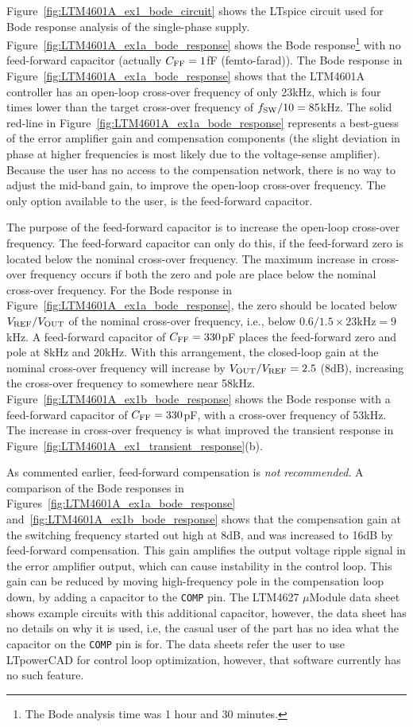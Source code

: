 Figure~\ref{fig:LTM4601A_ex1_bode_circuit} shows the LTspice
circuit used for Bode response analysis of the single-phase 
supply.
Figure~\ref{fig:LTM4601A_ex1a_bode_response} shows the
Bode response\footnote{The Bode analysis time
was 1 hour and 30 minutes.} with no feed-forward capacitor
(actually $C_{\rm FF} = 1$fF (femto-farad)).
The Bode response in Figure~\ref{fig:LTM4601A_ex1a_bode_response}
shows that the LTM4601A controller has an open-loop cross-over
frequency of only 23kHz, which is four times lower than the
target cross-over frequency of $f_{\rm SW}/10 = 85$kHz. 
The solid red-line in Figure~\ref{fig:LTM4601A_ex1a_bode_response}
represents a best-guess of the error amplifier gain and
compensation components (the slight deviation in phase at
higher frequencies is most likely due to the voltage-sense
amplifier). Because the user has no access to the compensation
network, there is no way to adjust the mid-band gain, to improve
the open-loop cross-over frequency. The only option available
to the user, is the feed-forward capacitor.

The purpose of the feed-forward capacitor is to increase the
open-loop cross-over frequency. The feed-forward capacitor can
only do this, if the feed-forward zero is located below the
nominal cross-over frequency. The maximum increase in
cross-over frequency occurs if both the zero and pole are
place below the nominal cross-over frequency.
For the Bode response in 
Figure~\ref{fig:LTM4601A_ex1a_bode_response}, the zero should
be located below $V_{\rm REF}/V_{\rm OUT}$ of the nominal cross-over
frequency, i.e., below $0.6/1.5\times23\text{kHz} = 9$kHz.
A feed-forward capacitor of $C_{\rm FF} = 330$pF places the
feed-forward zero and pole at 8kHz and 20kHz.
With this arrangement, the closed-loop gain at the nominal
cross-over frequency will increase by $V_{\rm OUT}/V_{\rm REF} = 2.5$
(8dB), increasing the cross-over frequency to somewhere near 58kHz.
Figure~\ref{fig:LTM4601A_ex1b_bode_response} shows the
Bode response with a feed-forward capacitor of
$C_{\rm FF} = 330$pF, with a cross-over frequency of 53kHz.
The increase in cross-over frequency is what improved the transient
response in Figure~\ref{fig:LTM4601A_ex1_transient_response}(b).

As commented earlier, feed-forward compensation is {\em not
recommended}. A comparison of the Bode responses in 
Figures~\ref{fig:LTM4601A_ex1a_bode_response}
and~\ref{fig:LTM4601A_ex1b_bode_response} shows that the
compensation gain at the switching frequency started out
high at 8dB, and was increased to 16dB by feed-forward
compensation. This gain amplifies the output voltage ripple
signal in the error amplifier output, which can cause
instability in the control loop.
This gain can be reduced by moving high-frequency pole
in the compensation loop down, by adding a capacitor to the
\verb+COMP+ pin. The LTM4627 $\mu$Module data sheet shows
example circuits with this additional capacitor, however,
the data sheet has no details on why it is used, i.e, the
casual user of the part has no idea what the capacitor
on the \verb+COMP+ pin is for. The data sheets refer the
user to use LTpowerCAD for control loop optimization,
however, that software currently has no such feature.

